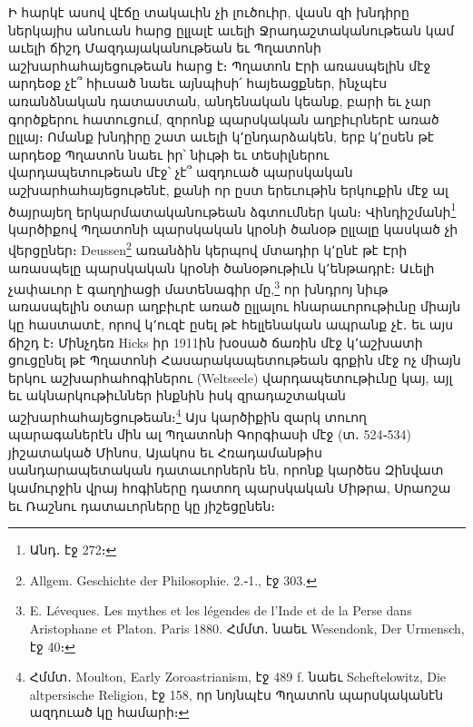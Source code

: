 \documentclass{article}
\begin{document}
{Ի հարկէ ասով վէճը տակաւին չի լուծուիր, վասն զի խնդիրը ներկայիս անուան հարց ըլլալէ աւելի Ջրադաշտականութեան կամ աւելի ճիշդ Մազդայականութեան եւ Պղատոնի աշխարհահայեցութեան հարց է։ Պղատոն Էրի առասպելին մէջ արդեօք չէ՞ հիւսած նաեւ այնպիսի՛ հայեացքներ, ինչպէս առանձնական դատաստան, անդենական կեանք, բարի եւ չար գործքերու հատուցում, զորոնք պարսկական աղբիւրներէ առած ըլլայ։ Ոմանք խնդիրը շատ աւելի կ՚ընդարձակեն, երբ կ՚ըսեն թէ արդեօք Պղատոն նաեւ իր՝ նիւթի եւ տեսիլներու վարդապետութեան մէջ՝ չէ՞ ազդուած պարսկական աշխարհահայեցութենէ, քանի որ ըստ երեւութին երկուքին մէջ ալ ծայրայեղ երկարմատականութեան ձգտումներ կան։ Վինդիշմանի\footnote{Անդ․ էջ 272։} կարծիքով Պղատոնի պարսկական կրօնի ծանօթ ըլլալը կասկած չի վերցըներ։ Deussen\footnote{Allgem. Geschichte der Philosophie. 2.֊1., էջ 303.} առանձին կերպով մտադիր կ՚ընէ թէ Էրի առասպելը պարսկական կրօնի ծանօթութիւն կ՚ենթադրէ։ Աւելի չափաւոր է գաղղիացի մատենագիր մը,\footnote{E. Léveques. Les mythes et les légendes de l'Inde et de la Perse dans Aristophane et Platon. Paris 1880. Հմմտ․ նաեւ Wesendonk, Der Urmensch, էջ 40։} որ խնդրոյ նիւթ առասպելին օտար աղբիւրէ առած ըլլալու հնարաւորութիւնը միայն կը հաստատէ, որով կ՚ուզէ ըսել թէ հելլենական ապրանք չէ․ եւ այս ճիշդ է։ Մինչդեռ Hicks իր 1911ին խօսած ճառին մէջ կ՚աշխատի ցուցընել թէ Պղատոնի Հասարակապետութեան գրքին մէջ ոչ միայն երկու աշխարհահոգիներու (Weltseele) վարդապետութիւնը կայ, այլ եւ ակնարկութիւններ ինքնին իսկ զրադաշտական աշխարհահայեցութեան։\footnote{Հմմտ․ Moulton, Early Zoroastrianism, էջ 489 f. նաեւ Scheftelowitz, Die altpersische Religion, էջ 158, որ նոյնպէս Պղատոն պարսկականէն ազդուած կը համարի։} Այս կարծիքին զարկ տուող պարագաներէն մին ալ Պղատոնի Գորգիասի մէջ (տ․ 524֊534) յիշատակած Մինոս, Այակոս եւ Հռադամանթիս սանդարապետական դատաւորներն են, որոնք կարծես Զինվատ կամուրջին վրայ հոգիները դատող պարսկական Միթրա, Սրաոշա եւ Ռաշնու դատաւորները կը յիշեցընեն։

}
\end{document}
